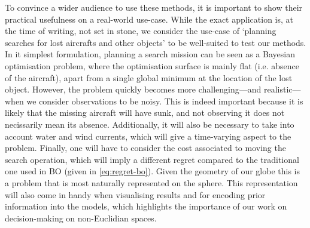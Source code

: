 To convince a wider audience to use these methods, it is important to show their practical usefulness on a real-world use-case. While the exact application is, at the time of writing, not set in stone, we consider the use-case of `planning searches for lost aircrafts and other objects' \citep{stone2014search} to be well-suited to test our methods. In it simplest formulation, planning a search mission can be seen as a Bayesian optimisation problem, where the optimisation surface is mainly flat (i.e. absence of the aircraft), apart from a single global minimum at the location of the lost object. However, the problem quickly becomes more challenging---and realistic---when we consider observations to be noisy. This is indeed important because it is likely that the missing aircraft will have sunk, and not observing it does not necissarily mean its absence. Additionally, it will also be necessary to take into account water and wind currents, which will give a time-varying aspect to the problem. Finally, one will have to consider the cost associated to moving the search operation, which will imply a different regret compared to the traditional one used in BO (given in \cref{eq:regret-bo}). Given the geometry of our globe this is a problem that is most naturally represented on the sphere. This representation will also come in handy when visualising results and for encoding prior information into the models, which highlights the importance of our work on decision-making on non-Euclidian spaces.







